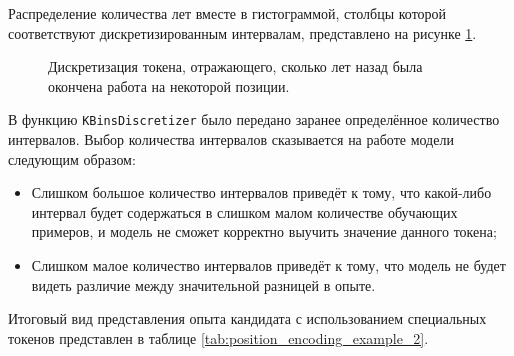 \documentclass[14pt]{mmcs_article}
\begin{document}
Распределение количества лет вместе в гистограммой, столбцы которой соответствуют дискретизированным интервалам, представлено на рисунке \ref{fig:experience_distribution}.

\begin{figure}[H]
  \centering
  \caption{\centering Дискретизация токена, отражающего, сколько лет назад была окончена работа на некоторой позиции.}
  \label{fig:experience_distribution}
\end{figure}


В функцию \texttt{KBinsDiscretizer} было передано заранее определённое количество интервалов. Выбор количества интервалов сказывается на работе модели следующим образом:

\begin{itemize}
  \item Слишком большое количество интервалов приведёт к тому, что какой-либо интервал будет содержаться в слишком малом количестве обучающих примеров, и модель не сможет корректно выучить значение данного токена;
  \item Слишком малое количество интервалов приведёт к тому, что модель не будет видеть различие между значительной разницей в опыте.
\end{itemize}

Итоговый вид представления опыта кандидата с использованием специальных токенов представлен в таблице \ref{tab:position_encoding_example_2}.
\end{document}
